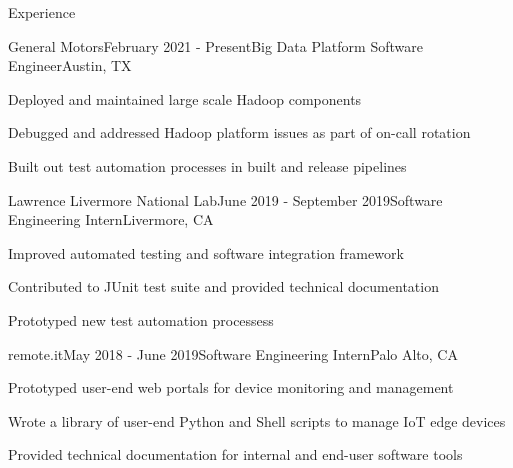 \documentclass{resume} %
\begin{document}

\begin{rSection}{Experience}
    \begin{rSubsection}{General Motors}{February 2021 - Present}{Big Data Platform Software Engineer}{Austin, TX}
        \item Deployed and maintained large scale Hadoop components
        \item Debugged and addressed Hadoop platform issues as part of on-call rotation
        \item Built out test automation processes in built and release pipelines
    \end{rSubsection}

    \begin{rSubsection}{Lawrence Livermore National Lab}{June 2019 - September 2019}{Software Engineering Intern}{Livermore, CA}
        \item Improved automated testing and software integration framework
        \item Contributed to JUnit test suite and provided technical documentation
        \item Prototyped new test automation processess 
    \end{rSubsection}

    \begin{rSubsection}{remote.it}{May 2018 - June 2019}{Software Engineering Intern}{Palo Alto, CA}
        \item Prototyped user-end web portals for device monitoring and management
        \item Wrote a library of user-end Python and Shell scripts to manage IoT edge devices
        \item Provided technical documentation for internal and end-user software tools
    \end{rSubsection}

\end{rSection}

\end{document}
